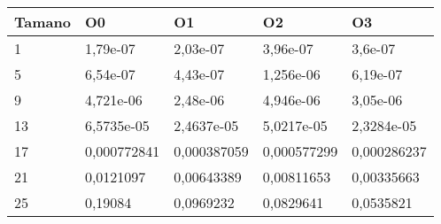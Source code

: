 \begin{tabular}{|l|l|l|l|l|}
	\hline
	Tamano & O0 & O1 & O2 & O3 \\
	\hline
	\hline
	1 & 1,79e-07 & 2,03e-07 & 3,96e-07 & 3,6e-07 \\
	\hline
	5 & 6,54e-07 & 4,43e-07 & 1,256e-06 & 6,19e-07 \\
	\hline
	9 & 4,721e-06 & 2,48e-06 & 4,946e-06 & 3,05e-06 \\
	\hline
	13 & 6,5735e-05 & 2,4637e-05 & 5,0217e-05 & 2,3284e-05 \\
	\hline
	17 & 0,000772841 & 0,000387059 & 0,000577299 & 0,000286237 \\
	\hline
	21 & 0,0121097 & 0,00643389 & 0,00811653 & 0,00335663 \\
	\hline
	25 & 0,19084 & 0,0969232 & 0,0829641 & 0,0535821 \\
	\hline
\end{tabular}
